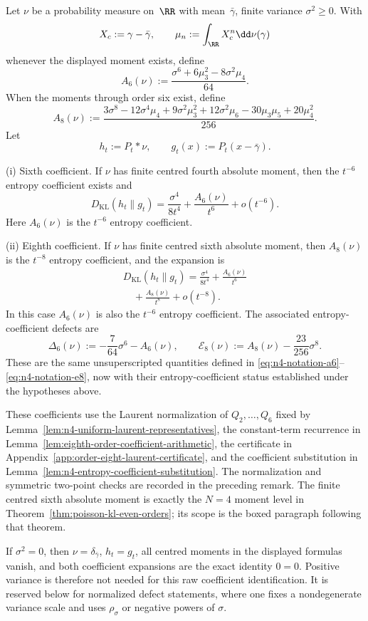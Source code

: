 \begin{theorem}%
\label{thm:poisson-kl-eighth}
Let $\nu$ be a probability measure on~$\RR$ with mean~$\bar{\gamma}$,
finite variance $\sigma^2\ge0$.  With
\[
X_c:=\gamma-\bar{\gamma},
\qquad
\mu_n:=\int_{\RR}X_c^n\dd\nu(\gamma)
\]
whenever the displayed moment exists, define
\[
A_6(\nu)
:=\frac{\sigma^6+6\mu_3^2-8\sigma^2\mu_4}{64}.
\]
When the moments through order six exist, define
\[
A_8(\nu)
:=
\frac{3\sigma^8-12\sigma^4\mu_4+9\sigma^2\mu_3^2
+12\sigma^2\mu_6-30\mu_3\mu_5+20\mu_4^2}{256}.
\]
Let
\[
h_t:=P_t*\nu,
\qquad
g_t(x):=P_t(x-\bar{\gamma}).
\]

\textup{(i) Sixth coefficient.}
If \(\nu\) has finite centred fourth absolute moment, then the \(t^{-6}\)
entropy coefficient exists and
\[
D_{\mathrm{KL}}(h_t\|g_t)
=\frac{\sigma^4}{8t^4}
+\frac{A_6(\nu)}{t^6}
+o(t^{-6}).
\]
Here \(A_6(\nu)\) is the \(t^{-6}\) entropy coefficient.

\textup{(ii) Eighth coefficient.}
If \(\nu\) has finite centred sixth absolute moment, then \(A_8(\nu)\) is the
\(t^{-8}\) entropy coefficient, and the expansion is
\begin{equation}\label{eq:poisson-kl-eighth}
\begin{split}
D_{\mathrm{KL}}(h_t\|g_t)
=\frac{\sigma^4}{8t^4}
+\frac{A_6(\nu)}{t^6}
\\
\quad
+\frac{A_8(\nu)}{t^8}
+o(t^{-8}).
\end{split}
\end{equation}
In this case \(A_6(\nu)\) is also the \(t^{-6}\) entropy coefficient.
The associated entropy-coefficient defects are
\[
\Delta_6(\nu)
:=-\frac{7}{64}\sigma^6-A_6(\nu),
\qquad
\mathcal E_8(\nu)
:=A_8(\nu)-\frac{23}{256}\sigma^8.
\]
These are the same unsuperscripted quantities defined in
\eqref{eq:n4-notation-a6}--\eqref{eq:n4-notation-e8}, now with their
entropy-coefficient status established under the hypotheses above.

These coefficients use the Laurent normalization of
\(Q_2,\ldots,Q_6\) fixed by
Lemma~\ref{lem:n4-uniform-laurent-representatives}, the constant-term
recurrence in Lemma~\ref{lem:eighth-order-coefficient-arithmetic}, the
certificate in Appendix~\ref{app:order-eight-laurent-certificate}, and the
coefficient substitution in
Lemma~\ref{lem:n4-entropy-coefficient-substitution}.  The normalization and
symmetric two-point checks are recorded in the preceding remark.  The finite
centred sixth absolute moment is exactly the \(N=4\) moment level in
Theorem~\ref{thm:poisson-kl-even-orders}; its scope is the boxed paragraph
following that theorem.

If \(\sigma^2=0\), then \(\nu=\delta_{\bar{\gamma}}\),
\(h_t=g_t\), all centred moments in the displayed formulas vanish, and both
coefficient expansions are the exact identity \(0=0\).  Positive variance is
therefore not needed for this raw coefficient identification.  It is reserved
below for normalized defect statements, where one fixes a nondegenerate
variance scale and uses \(\rho_\sigma\) or negative powers of \(\sigma\).
\end{theorem}

